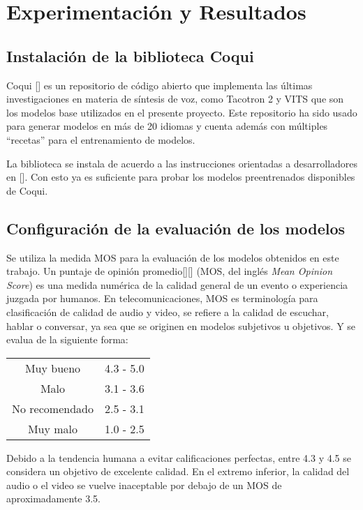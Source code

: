 \chapter{Experimentación y Resultados}\label{chapter:implementation}

\section{Instalación de la biblioteca Coqui}
Coqui [\cite{coqui-doc}] es un repositorio de código abierto que implementa las últimas investigaciones en materia de síntesis de voz, como Tacotron 2 y VITS que son los modelos base utilizados en el presente proyecto. Este repositorio ha sido usado para generar modelos en más de 20 idiomas  y cuenta además con múltiples ``recetas'' para el entrenamiento de modelos. 

La biblioteca se instala de acuerdo a las instrucciones orientadas a desarrolladores en [\cite{coqui-doc}].
Con esto ya es suficiente para probar los modelos preentrenados disponibles de Coqui.

\section{Configuración de la evaluación de los modelos} \label{eval}
Se utiliza la medida MOS para la evaluación de los modelos obtenidos en este trabajo. Un puntaje de opinión promedio[\cite{mos}][\cite{mos1}] (MOS, del inglés \textit{Mean Opinion Score}) es una medida numérica de la calidad general de un evento o experiencia juzgada por humanos. En telecomunicaciones, MOS es terminología para clasificación de calidad de audio y video, se refiere a la calidad de escuchar, hablar o conversar, ya sea que se originen en modelos subjetivos u objetivos. Y se evalua de la siguiente forma:
 
  \begin{longtable} [c] { | c | c | }
	\hline
	\endfirsthead
\hline
\endhead
\hline
\endfoot
\hline
\endlastfoot
Muy bueno & 4.3 - 5.0 \\
Malo & 3.1 - 3.6 \\
No recomendado &  2.5 - 3.1\\
Muy malo & 1.0 - 2.5
\label {longtable:1}
\end{longtable}

Debido a la tendencia humana a evitar calificaciones perfectas, entre 4.3 y 4.5 se considera un objetivo de excelente calidad. En el extremo inferior, la calidad del audio o el video se vuelve inaceptable por debajo de un MOS de aproximadamente 3.5. \\

